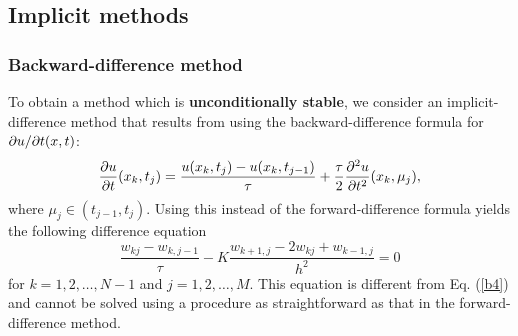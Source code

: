 %
%
%


\subsection{Implicit methods}

\subsubsection{Backward-difference method}
 
To obtain a method which is {\bf unconditionally stable}, we consider
an implicit-difference method that results from using the backward-difference formula for
${\partial} u/{\partial} t(x,t)$:
\[
\frac{{\partial} u}{{\partial} t}(x_{k},t_{j})=\frac{u(x_{k},t_{j})-u(x_{k},t_{j-1})}{\tau}+
\frac{\tau}{2}\frac{{\partial}^{2} u}{{\partial} t^{2}}(x_{k}, \mu_{j}),
\]
where $\mu_{j}\in(t_{j-1},t_{j})$. Using this instead of the forward-difference formula
yields the following difference equation
\begin{equation}
\frac{w_{kj}-w_{k,j-1}}{\tau}-K
\frac{w_{k+1, j}-2w_{kj}+w_{k-1,j}}{h^{2}}=0 \label{x9}
\end{equation}
for $k=1, 2, \dots, N-1$ and $j=1, 2, \dots,M$. This equation is different from Eq. (\ref{b4})
and cannot be solved using a procedure as straightforward as that
in the forward-difference method.

 
 
